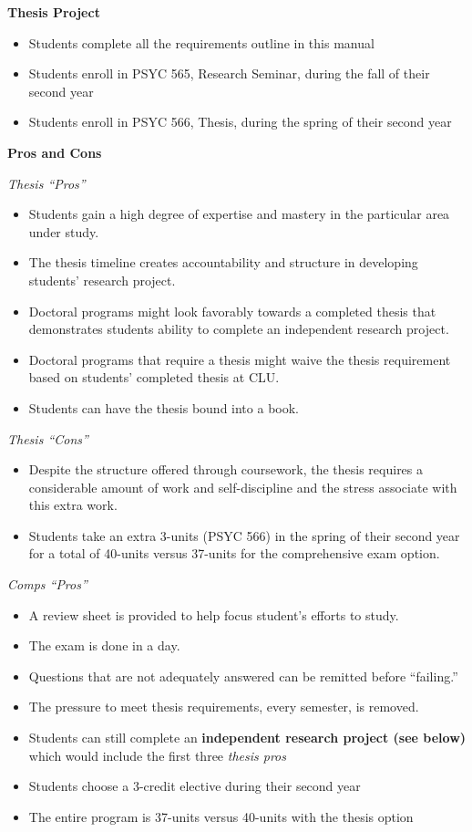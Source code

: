 \documentclass[openany]{book}
\providecommand{\tightlist}{%
  \setlength{\itemsep}{0pt}\setlength{\parskip}{0pt}}
\begin{document}
\textbf{Thesis Project}

\begin{itemize}
\tightlist
\item
  Students complete all the requirements outline in this manual
\item
  Students enroll in PSYC 565, Research Seminar, during the fall of their second year
\item
  Students enroll in PSYC 566, Thesis, during the spring of their second year
\end{itemize}

\textbf{Pros and Cons}

\emph{Thesis ``Pros''}

\begin{itemize}
\tightlist
\item
  Students gain a high degree of expertise and mastery in the particular area under study.
\item
  The thesis timeline creates accountability and structure in developing students' research project.
\item
  Doctoral programs might look favorably towards a completed thesis that demonstrates students ability to complete an independent research project.
\item
  Doctoral programs that require a thesis might waive the thesis requirement based on students' completed thesis at CLU.
\item
  Students can have the thesis bound into a book.
\end{itemize}

\emph{Thesis ``Cons''}

\begin{itemize}
\tightlist
\item
  Despite the structure offered through coursework, the thesis requires a considerable amount of work and self-discipline and the stress associate with this extra work.
\item
  Students take an extra 3-units (PSYC 566) in the spring of their second year for a total of 40-units versus 37-units for the comprehensive exam option.
\end{itemize}

\emph{Comps ``Pros''}

\begin{itemize}
\tightlist
\item
  A review sheet is provided to help focus student's efforts to study.
\item
  The exam is done in a day.
\item
  Questions that are not adequately answered can be remitted before ``failing.''
\item
  The pressure to meet thesis requirements, every semester, is removed.
\item
  Students can still complete an \textbf{independent research project (see below)} which would include the first three \emph{thesis pros}
\item
  Students choose a 3-credit elective during their second year
\item
  The entire program is 37-units versus 40-units with the thesis option
\end{itemize}
\end{document}
